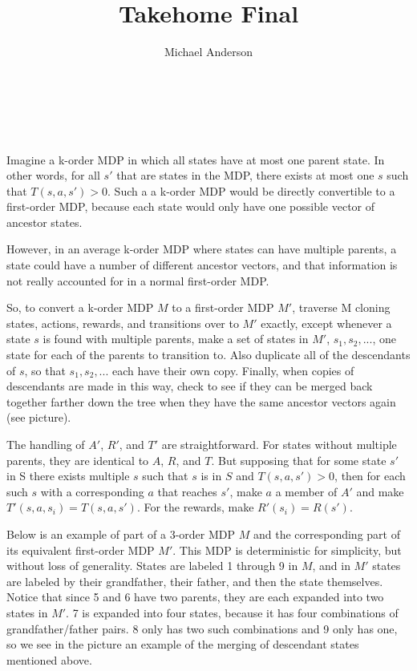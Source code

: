 \documentclass{article}
\author{Michael Anderson}
\title{Takehome Final}
\begin{document}
\maketitle
{}
\\
\flushleft
\newpage

\section{}
Imagine a k-order MDP in which all states have at most one parent state. In
other words, for all $s'$ that are states in the MDP, there exists at most one
$s$ such that $T(s,a,s') > 0$. Such a a k-order MDP would be directly
convertible to a first-order MDP, because each state would only have one
possible vector of ancestor states.

\vspace{1em}

However, in an average k-order MDP where states can have multiple parents,
a state could have a number of different ancestor vectors, and that information
is not really accounted for in a normal first-order MDP.

\vspace{1em}

So, to convert a k-order MDP $M$ to a first-order MDP $M'$, traverse M cloning
states, actions, rewards, and transitions over to $M'$ exactly, except
whenever a state $s$ is found with multiple parents, make a set of states in
$M'$, ${s_1,s_2,...}$, one state for each of the parents to transition to. Also
duplicate all of the descendants of $s$, so that $s_1,s_2,...$ each have their
own copy. Finally, when copies of descendants are made in this way, check to
see if they can be merged back together farther down the tree when they have the
same ancestor vectors again (see picture).

\vspace{1em}

The handling of $A'$, $R'$, and $T'$ are straightforward. For states without
multiple
parents, they are identical to $A$, $R$, and $T$. But supposing that for some
state
$s'$ in S there exists multiple $s$ such that $s$ is in $S$ and $T(s,a,s') > 0$,
then for each such $s$ with a corresponding $a$ that reaches $s'$, make $a$ a
member of $A'$ and make $T'(s,a,s_i) = T(s,a,s')$. For the rewards, make
$R'(s_i) = R(s')$.

\vspace{1em}

Below is an example of part of a 3-order MDP $M$ and the corresponding part of
its equivalent first-order MDP $M'$. This MDP is deterministic for simplicity,
but without loss of generality.
States are labeled 1 through 9 in $M$, and
in $M'$ states are labeled by their grandfather, their father, and then the
state themselves. Notice that since 5 and 6 have two parents, they are each
expanded into two states in $M'$. 7 is expanded into four states, because it
has four combinations of grandfather/father pairs. 8 only has two such
combinations and 9 only has one, so we see in the picture an example of the
merging of descendant states mentioned above. 
\end{document}
